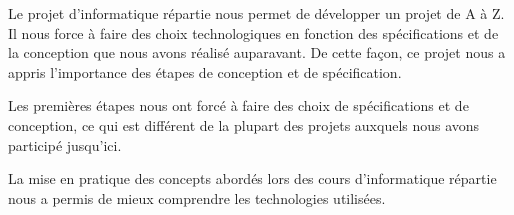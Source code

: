 Le projet d'informatique répartie nous permet de développer un projet de A à Z. Il nous force à faire des choix technologiques en fonction des spécifications et de la conception que nous avons réalisé auparavant. De cette façon, ce projet nous a appris l'importance des étapes de conception et de spécification. 

Les premières étapes nous ont forcé à faire des choix de spécifications et de conception, ce qui est différent de la plupart des projets auxquels nous avons participé jusqu'ici.

La mise en pratique des concepts abordés lors des cours d'informatique répartie nous a permis de mieux comprendre les technologies utilisées. 